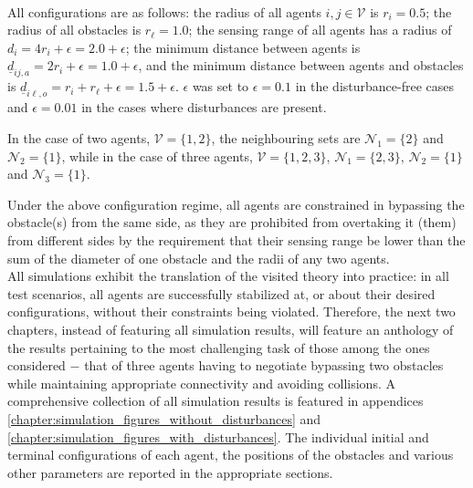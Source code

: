 \noindent{}\\[2.5ex]

All configurations are as follows: the radius of all agents
$i,j \in \mathcal{V}$ is $r_i = 0.5$; the radius of all obstacles is
$r_{\ell} = 1.0$; the sensing range of all agents has a radius of
$d_i = 4r_i + \epsilon = 2.0 + \epsilon$; the minimum distance between agents
is $\underline{d}_{ij,a} = 2r_i + \epsilon = 1.0 + \epsilon$, and the minimum
distance between agents and obstacles is
$\underline{d}_{i\ell,o} = r_i + r_{\ell} + \epsilon = 1.5 + \epsilon$.
$\epsilon$ was set to $\epsilon = 0.1$ in the disturbance-free cases and
$\epsilon = 0.01$ in the cases where disturbances are present.

In the case of two agents, $\mathcal{V} = \{1,2\}$,
the neighbouring sets are $\mathcal{N}_1 = \{2\}$
and $\mathcal{N}_2 = \{1\}$, while in the case of three agents,
$\mathcal{V} = \{1,2,3\}$, $\mathcal{N}_1 = \{2,3\}$,
$\mathcal{N}_2 = \{1\}$ and $\mathcal{N}_3 = \{1\}$.

Under the above configuration regime, all agents are constrained in bypassing
the obstacle(s) from the same side, as they are prohibited from overtaking it
(them) from different sides by the requirement that their sensing range be
lower than the sum of the diameter of one obstacle and the radii of any two
agents.\\[2.5ex]

All simulations exhibit the translation of the visited theory into practice:
in all test scenarios, all agents are successfully stabilized at, or about
their desired configurations, without their constraints being violated.
Therefore, the next two chapters, instead of featuring all simulation results,
will feature an anthology of the results pertaining to the most challenging task
of those among the ones considered $-$ that of three agents having to negotiate
bypassing two obstacles while maintaining appropriate connectivity and avoiding
collisions. A comprehensive collection of all simulation results is featured in
appendices \ref{chapter:simulation_figures_without_disturbances} and
\ref{chapter:simulation_figures_with_disturbances}. The individual initial
and terminal configurations of each agent, the positions of the obstacles and
various other parameters are reported in the appropriate sections.
